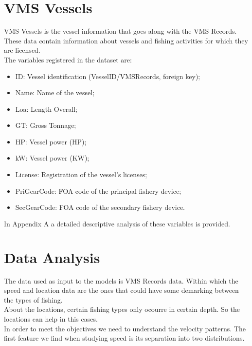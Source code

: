 \section{VMS Vessels} %
\label{sub:vms_vessels}
VMS Vessels is the vessel information that goes along with the VMS Records. These data contain information about vessels and fishing activities for which they are licensed.  \\
The variables registered in the dataset are:
\begin{itemize}
\item	ID: Vessel identification (VesselID/VMSRecords, foreign key);
\item	Name: Name of the vessel;
\item	Loa: Length Overall; 
\item	GT: Gross Tonnage;
\item	HP: Vessel power (HP);
\item	kW: Vessel power (KW);
\item	License: Registration of the vessel's licenses;
\item	PriGearCode: FOA code of the principal fishery device;
\item	SecGearCode: FOA code of the secondary fishery device.
\end{itemize}
In Appendix A a detailed descriptive analysis of these variables is provided.



\section{Data Analysis} %
\label{sub:data_analysis}



The data used as input to the models is VMS Records data. Within which the speed and location data are the ones that could have some demarking between the types of fishing.\\
About the locations, certain fishing types only ocourre in certain depth. So the locations can help in this cases. \\
In order to meet the objectives we need to understand the velocity patterns.
The first feature we find when studying speed is its separation into two distributions.

